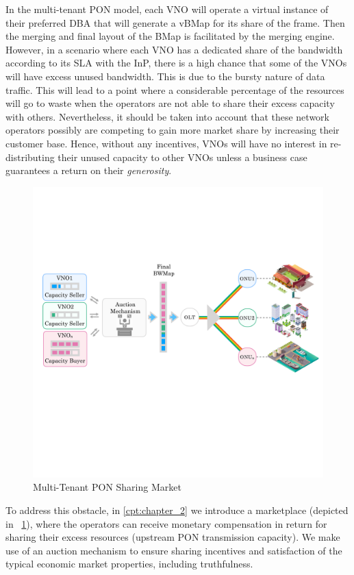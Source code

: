 In the multi-tenant \ac{PON} model, each \ac{VNO} will operate a virtual instance of their preferred \ac{DBA} that will generate a \ac{vBMap} for its share of the frame. Then the merging and final layout of the \ac{BMap} is facilitated by the merging engine. %
However, in a scenario where each \ac{VNO} has a dedicated share of the bandwidth according to its \ac{SLA} with the \ac{InP}, there is a high chance that some of the \acp{VNO} will have excess unused bandwidth. This is due to the bursty nature of data traffic. This will lead to a point where a considerable percentage of the resources will go to waste when the operators are not able to share their excess capacity with others. 
Nevertheless, it should be taken into account that these network operators possibly are competing to gain more market share by increasing their customer base. Hence, without any incentives, \acp{VNO} will have no interest in re-distributing their unused capacity to other \acp{VNO} unless a business case guarantees a return on their \textit{generosity}. 
\begin{figure}
\centering
\includegraphics[width=\linewidth]{Figures/pon_new.pdf}
\caption{Multi-Tenant PON Sharing Market}
\label{market-fig-intro}
\end{figure}
To address this obstacle, in \autoref{cpt:chapter_2} we introduce a marketplace (depicted in \figureautorefname~\ref{market-fig-intro}), where the operators can receive monetary compensation in return for sharing their excess resources (upstream PON transmission capacity). We make use of an auction mechanism to ensure sharing incentives and satisfaction of the typical economic market properties, including truthfulness.
